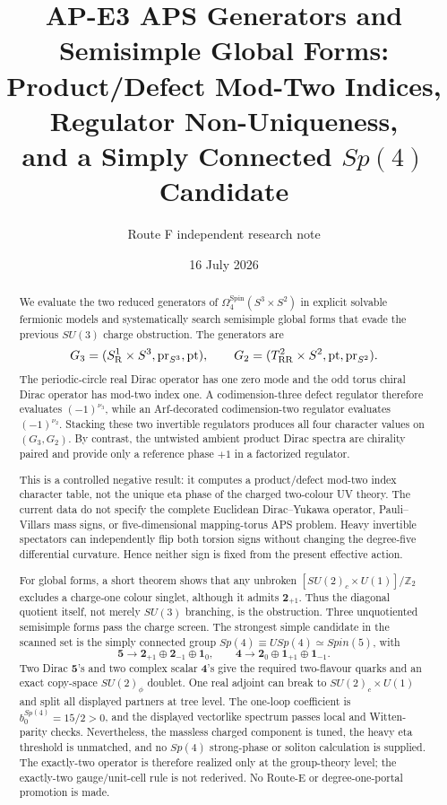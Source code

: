 \documentclass[11pt]{article}
\title{AP-E3 APS Generators and Semisimple Global Forms:\\
Product/Defect Mod-Two Indices, Regulator Non-Uniqueness,\\
and a Simply Connected \(Sp(4)\) Candidate}
\author{Route F independent research note}
\date{16 July 2026}
\theoremstyle{definition}
\theoremstyle{remark}
\newcommand{\ZZ}{\mathbb Z}
\begin{document}
\maketitle

\begin{abstract}
We evaluate the two reduced generators of
\(\Omega_4^{\mathrm{Spin}}(S^3\times S^2)\) in explicit solvable fermionic
models and systematically search semisimple global forms that evade the
previous \(SU(3)\) charge obstruction.  The generators are
\[
 G_3=(S^1_{\rm R}\times S^3,\operatorname{pr}_{S^3},{\rm pt}),
 \qquad
 G_2=(T^2_{\rm RR}\times S^2,{\rm pt},\operatorname{pr}_{S^2}).
\]
The periodic-circle real Dirac operator has one zero mode and the odd torus
chiral Dirac operator has mod-two index one.  A codimension-three defect
regulator therefore evaluates \((-1)^{\nu_3}\), while an Arf-decorated
codimension-two regulator evaluates \((-1)^{\nu_2}\).  Stacking these two
invertible regulators produces all four character values on \((G_3,G_2)\).
By contrast, the untwisted ambient product Dirac spectra are chirality paired
and provide only a reference phase \(+1\) in a factorized regulator.

This is a controlled negative result: it computes a product/defect mod-two
index character table, not the unique eta phase of the charged two-colour UV
theory.  The current data do not specify the complete Euclidean
Dirac--Yukawa operator, Pauli--Villars mass signs, or five-dimensional
mapping-torus APS problem.  Heavy invertible spectators can independently
flip both torsion signs without changing the degree-five differential
curvature.  Hence neither sign is fixed from the present effective action.

For global forms, a short theorem shows that any unbroken
\([SU(2)_c\times U(1)]/\ZZ_2\) excludes a charge-one colour singlet, although
it admits \(\bm2_{+1}\).  Thus the diagonal quotient itself, not merely
\(SU(3)\) branching, is the obstruction.  Three unquotiented semisimple
forms pass the charge screen.  The strongest simple candidate in the scanned
set is the simply connected group
\(Sp(4)\equiv USp(4)\simeq Spin(5)\), with
\[
 \bm5\to\bm2_{+1}\oplus\bm2_{-1}\oplus\bm1_0,
 \qquad
 \bm4\to\bm2_0\oplus\bm1_{+1}\oplus\bm1_{-1}.
\]
Two Dirac \(\bm5\)'s and two complex scalar \(\bm4\)'s give the required
two-flavour quarks and an exact copy-space \(SU(2)_\phi\) doublet.  One real
adjoint can break to \(SU(2)_c\times U(1)\) and split all displayed partners
at tree level.  The one-loop coefficient is \(b_0^{Sp(4)}=15/2>0\), and the
displayed vectorlike spectrum passes local and Witten-parity checks.
Nevertheless, the massless charged component is tuned, the heavy eta
threshold is unmatched, and no \(Sp(4)\) strong-phase or soliton calculation
is supplied.  The exactly-two operator is therefore realized only at the
group-theory level; the exactly-two gauge/unit-cell rule is not rederived.
No Route-E or degree-one-portal promotion is made.
\end{abstract}
\end{document}
